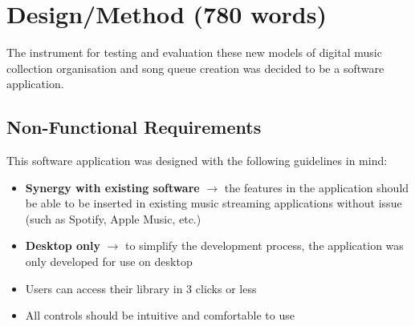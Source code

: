 \chapter{Design/Method (780 words)}

The instrument for testing and evaluation these new models of digital music collection organisation and song queue creation was decided to be a software application.

\section{Non-Functional Requirements}
This software application was designed with the following guidelines in mind:\begin{itemize}
    \item \textbf{
        Synergy with existing software
    } \(\to\) the features in the application should be able to be inserted in existing music streaming applications without issue (such as Spotify, Apple Music, etc.) %
    \item \textbf{
        Desktop only
    } \(\to\) to simplify the development process, the application was only developed for use on desktop
    \item Users can access their library in 3 clicks or less %
    \item All controls should be intuitive and comfortable to use
\end{itemize} %

